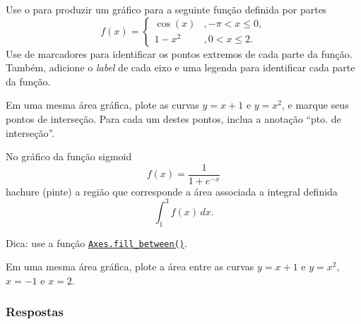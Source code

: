 \begin{exer}
  Use o {\matplotlib} para produzir um gráfico para a seguinte função definida por partes
  \begin{equation}
    f(x) = \left\{
      \begin{array}{ll}
        \cos(x) &, -\pi < x \leq 0,\\
        1-x^2 &, 0 < x \leq 2.
      \end{array}
    \right.
  \end{equation}
  Use de marcadores para identificar os pontos extremos de cada parte da função. Também, adicione o \textit{label} de cada eixo e uma legenda para identificar cada parte da função.
\end{exer}

\begin{exer}
  Em uma mesma área gráfica, plote as curvas $y = x + 1$ e $y = x^2$, e marque seus pontos de interseção. Para cada um destes pontos, inclua a anotação ``pto. de interseção''.
\end{exer}

\begin{exer}
  No gráfico da função sigmoid
  \begin{equation}
    f(x) = \frac{1}{1 + e^{-x}}
  \end{equation}
  hachure (pinte) a região que corresponde a área associada a integral definida
  \begin{equation}
    \int_1^3 f(x)\,dx.
  \end{equation}
\end{exer}
\begin{resp}
  Dica: use a função \href{https://matplotlib.org/stable/api/_as_gen/matplotlib.axes.Axes.fill_between.html#matplotlib.axes.Axes.fill_between}{\lstinline+Axes.fill_between()+}.
\end{resp}

\begin{ex}
  Em uma mesma área gráfica, plote a área entre as curvas $y = x + 1$ e $y = x^2$, $x=-1$ e $x=2$.
\end{ex}

\ifisbook
\subsubsection{Respostas}
\shipoutAnswer
\fi

